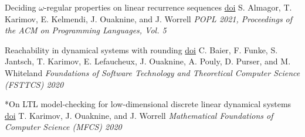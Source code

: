 \documentclass{article}
\begin{document}
\begin{etaremune}
		\item 
		{\large *Deciding $\omega$-regular properties on linear recurrence sequences}
		\quad
		\href{https://doi.org/10.1145/3434329}{doi}
		\vspace{0.2cm}\newline
		S. Almagor, T. Karimov, E. Kelmendi, J. Ouaknine, and J. Worrell
		\vspace*{0.25cm}\newline
		\emph{POPL 2021, Proceedings of the ACM on Programming Languages, Vol. 5}
		\vspace*{0.2cm} 
		
		\item
		{\large Reachability in dynamical systems with rounding} 
		\quad
		\href{https://doi.org/10.4230/LIPIcs.FSTTCS.2020.36}{doi}
		\vspace{0.2cm} \newline
		C. Baier, F. Funke, S. Jantsch, T. Karimov, E. Lefaucheux, J. Ouaknine,
		A. Pouly, D. Purser, and M. Whiteland
		\vspace*{0.25cm}\newline                 
		\emph{Foundations of Software Technology and Theoretical Computer Science (FSTTCS) 2020}
		\vspace*{0.2cm}
		
		\item 
		\large {*On LTL model-checking for low-dimensional discrete linear dynamical systems}
		\quad
		\href{https://doi.org/10.4230/LIPIcs.MFCS.2020.54}{doi}%
		\vspace{0.25cm}\newline       
		T. Karimov, J. Ouaknine, and J. Worrell
		\vspace*{0.2cm}\newline 
		\emph{Mathematical Foundations of Computer Science (MFCS) 2020}
		\vspace*{0.2cm}
	\end{etaremune}
	
	\vspace*{0.1cm}
	
\end{document}
